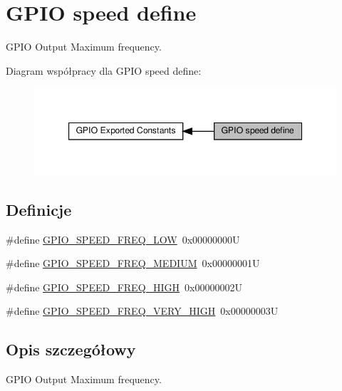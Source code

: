 \hypertarget{group___g_p_i_o__speed__define}{}\section{G\+P\+IO speed define}
\label{group___g_p_i_o__speed__define}


G\+P\+IO Output Maximum frequency.  


Diagram współpracy dla G\+P\+IO speed define\+:\nopagebreak
\begin{figure}[H]
\begin{center}
\leavevmode
\includegraphics[width=347pt]{group___g_p_i_o__speed__define}
\end{center}
\end{figure}
\subsection*{Definicje}
\begin{DoxyCompactItemize}
\item 
\#define \hyperlink{group___g_p_i_o__speed__define_gab7916c4265bfa1b26a5205ea9c1caa4e}{G\+P\+I\+O\+\_\+\+S\+P\+E\+E\+D\+\_\+\+F\+R\+E\+Q\+\_\+\+L\+OW}~0x00000000U
\item 
\#define \hyperlink{group___g_p_i_o__speed__define_ga1724a25a9cf00ebf485daeb09cfa1e25}{G\+P\+I\+O\+\_\+\+S\+P\+E\+E\+D\+\_\+\+F\+R\+E\+Q\+\_\+\+M\+E\+D\+I\+UM}~0x00000001U
\item 
\#define \hyperlink{group___g_p_i_o__speed__define_gaef5898db71cdb957cd41f940b0087af8}{G\+P\+I\+O\+\_\+\+S\+P\+E\+E\+D\+\_\+\+F\+R\+E\+Q\+\_\+\+H\+I\+GH}~0x00000002U
\item 
\#define \hyperlink{group___g_p_i_o__speed__define_ga1944cf10e2ab172810d38b681d40b771}{G\+P\+I\+O\+\_\+\+S\+P\+E\+E\+D\+\_\+\+F\+R\+E\+Q\+\_\+\+V\+E\+R\+Y\+\_\+\+H\+I\+GH}~0x00000003U
\end{DoxyCompactItemize}


\subsection{Opis szczegółowy}
G\+P\+IO Output Maximum frequency. 



